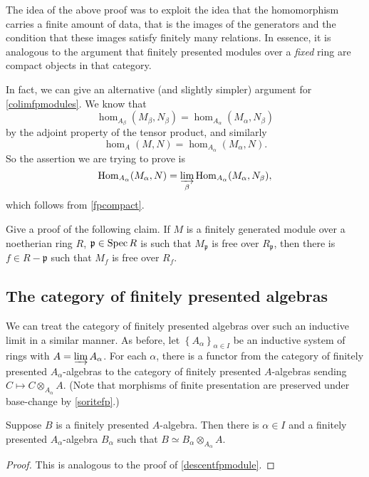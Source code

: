 \begin{remark} 
The idea of the above proof was to exploit the idea that the homomorphism
carries a finite amount of data, that is the images of the generators and the
condition that these images satisfy finitely many relations. In essence, it is
analogous to the argument that finitely presented modules over a \emph{fixed}
ring are compact objects in that category. 
\end{remark} 


\begin{remark} 
In fact, we can give an alternative (and slightly simpler) argument for \cref{colimfpmodules}. 
We know that
\[ \hom_{A_\beta}(M_\beta, N_\beta) = \hom_{A_\alpha}(M_\alpha, N_\beta)  \]
by the adjoint property of the tensor product, and similarly
\[ \hom_{A}(M,N) = \hom_{A_\alpha}(M_\alpha, N).  \]
So the assertion we are trying to prove is 
\[ \hom_{A_\alpha}(M_\alpha, N) = \varinjlim_{\beta} \hom_{A_\alpha}(M_\alpha,
N_\beta) , \]
which follows from \cref{fpcompact}.
\end{remark} 

\begin{exercise} 
Give a proof of the following claim. If $M$ is a finitely generated module
over a noetherian ring $R$, $\mathfrak{p} \in \spec R$ is such that
$M_{\mathfrak{p}}$ is free over $R_{\mathfrak{p}}$, then there is $f \in R - \mathfrak{p}$ such that
$M_f$ is free over $R_f$.
\end{exercise} 

\subsection{The category of finitely presented algebras}

We can treat the category of finitely presented algebras over such an
inductive limit in a similar manner. 
As before, let $\left\{A_\alpha\right\}_{\alpha \in I}$ be an inductive system
of rings with $A = \varinjlim A_\alpha$. 
For each $\alpha$, there is a  functor from the category of finitely presented $A_\alpha$-algebras
to the category of finitely presented $A$-algebras sending $C \mapsto C
\otimes_{A_\alpha} A$. 
(Note that morphisms of finite presentation are preserved under base-change by
\cref{soritefp}.)

\begin{proposition} 
Suppose $B$ is a finitely presented $A$-algebra. Then there is $\alpha \in I$
and a finitely presented $A_\alpha$-algebra $B_\alpha$ such that $B \simeq
B_\alpha \otimes_{A_\alpha} A$.
\end{proposition} 
\begin{proof} 
This is analogous to the proof of \cref{descentfpmodule}.
\end{proof} 


